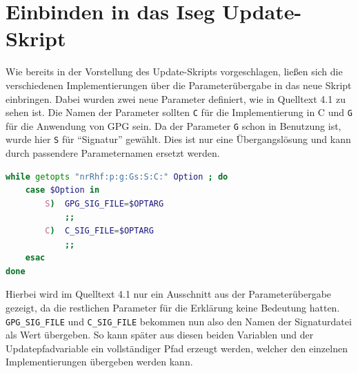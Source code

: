 \documentclass[thesis=bachelor,faculty=cb]{hsmw-thesis}
\begin{document}
{\section{Einbinden in das Iseg Update-Skript}
Wie bereits in der Vorstellung des Update-Skripts vorgeschlagen, ließen sich die verschiedenen Implementierungen über die Parameterübergabe in das neue Skript einbringen. Dabei wurden zwei neue Parameter definiert, wie in Quelltext 4.1 zu sehen ist. Die Namen der Parameter sollten \texttt{C} für die Implementierung in C und \texttt{G} für die Anwendung von GPG sein. Da der Parameter \texttt{G} schon in Benutzung ist, wurde hier \texttt{S} für \enquote{Signatur} gewählt. Dies ist nur eine Übergangslösung und kann durch passendere Parameternamen ersetzt werden. 
\begin{lstlisting}[language=bash, caption={neue Parameter icsupdate.sh}]
while getopts "nrRhf:p:g:Gs:S:C:" Option ; do
	case $Option in
		S)	GPG_SIG_FILE=$OPTARG
			;;
		C)	C_SIG_FILE=$OPTARG
			;;
	esac
done
\end{lstlisting}
Hierbei wird im Quelltext 4.1 nur ein Ausschnitt aus der Parameterübergabe gezeigt, da die restlichen Parameter für die Erklärung keine Bedeutung hatten.
\texttt{GPG\_SIG\_FILE} und \texttt{C\_SIG\_FILE} bekommen nun also den Namen der Signaturdatei als Wert übergeben. So kann später aus diesen beiden Variablen und der Updatepfadvariable ein vollständiger Pfad erzeugt werden, welcher den einzelnen Implementierungen übergeben werden kann.
\\[1cm]
}
\end{document}
